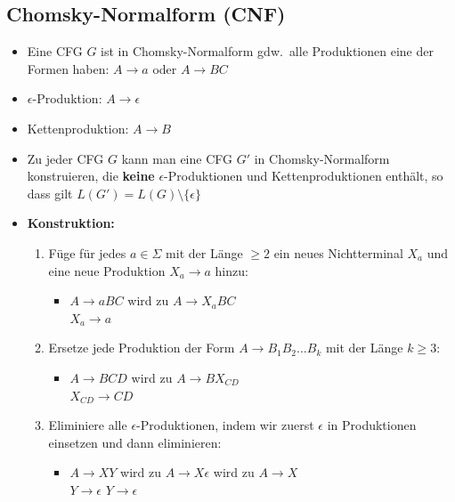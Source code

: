\documentclass[ieeetran]{article}
\begin{document}
\subsection{Chomsky-Normalform (CNF)} %
\label{sub:chomsky_normalform_cNF_}
\begin{itemize}
  \item Eine CFG $G$ ist in Chomsky-Normalform gdw.\ alle Produktionen eine der Formen haben: $A \rightarrow a$ oder $A \rightarrow BC$
\item $\epsilon$-Produktion: $A \rightarrow \epsilon$
\item Kettenproduktion: $A \rightarrow B$

  \item Zu jeder CFG $G$ kann man eine CFG $G'$ in Chomsky-Normalform konstruieren, die \textbf{keine} $\epsilon$-Produktionen und Kettenproduktionen enthält, so dass gilt $L(G') = L(G) \setminus \{\epsilon\}$

\pagebreak

\item \textbf{Konstruktion:}
	\begin{enumerate}
	  \item Füge für jedes $a \in \Sigma$ mit der Länge $\ge 2$ ein neues Nichtterminal $X_a$ und eine neue Produktion $X_a \rightarrow a$ hinzu:
	\begin{itemize}
		\item $A \rightarrow aBC$ wird zu $A \rightarrow X_aBC$
			\\ \hspace*{2.9cm}$X_a \rightarrow a$
	\end{itemize}

\item Ersetze jede Produktion der Form $A \rightarrow B_1B_2\ldots B_k$ mit der Länge $k \ge 3$:
	\begin{itemize}
		\item $A \rightarrow BCD$ wird zu $A \rightarrow BX_{CD}$
\\ \hspace*{3cm}$X_{CD} \rightarrow CD$

\end{itemize}


\item Eliminiere alle $\epsilon$-Produktionen, indem wir zuerst $\epsilon$ in Produktionen einsetzen und dann eliminieren:
	\begin{itemize}
	  \item $A \rightarrow XY$ wird zu $A \rightarrow X\epsilon$ wird zu $A \rightarrow X$
		  \\$Y \rightarrow \epsilon$ \hspace*{1.6cm} $Y \rightarrow \epsilon$
	\end{itemize}



\end{enumerate}
\end{itemize}
\end{document}
